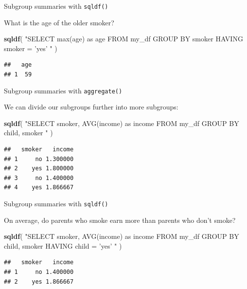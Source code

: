\documentclass[ignorenonframetext,]{beamer}
\newenvironment{Shaded}{\begin{snugshade}}{\end{snugshade}}
\newcommand{\KeywordTok}[1]{\textcolor[rgb]{0.13,0.29,0.53}{\textbf{#1}}}
\newcommand{\NormalTok}[1]{#1}
\newcommand{\StringTok}[1]{\textcolor[rgb]{0.31,0.60,0.02}{#1}}
\begin{document}
\begin{frame}[fragile]{Subgroup summaries with \texttt{sqldf()}}
\protect\hypertarget{subgroup-summaries-with-sqldf-5}{}

What is the age of the older smoker?

\begin{Shaded}
\begin{Highlighting}[]
\KeywordTok{sqldf}\NormalTok{(}
  \StringTok{"SELECT max(age) as age }
\StringTok{  FROM my_df}
\StringTok{  GROUP BY smoker}
\StringTok{  HAVING smoker = 'yes'}
\StringTok{  "}
\NormalTok{)}
\end{Highlighting}
\end{Shaded}

\begin{verbatim}
##   age
## 1  59
\end{verbatim}

\end{frame}

\begin{frame}[fragile]{Subgroup summaries with \texttt{aggregate()}}
\protect\hypertarget{subgroup-summaries-with-aggregate-25}{}

We can divide our subgroups further into more subgroups:

\begin{Shaded}
\begin{Highlighting}[]
\KeywordTok{sqldf}\NormalTok{(}
  \StringTok{"SELECT smoker, AVG(income) as income}
\StringTok{  FROM my_df}
\StringTok{  GROUP BY child, smoker}
\StringTok{  "}
\NormalTok{)}
\end{Highlighting}
\end{Shaded}

\begin{verbatim}
##   smoker   income
## 1     no 1.300000
## 2    yes 1.800000
## 3     no 1.400000
## 4    yes 1.866667
\end{verbatim}

\end{frame}

\begin{frame}[fragile]{Subgroup summaries with \texttt{sqldf()}}
\protect\hypertarget{subgroup-summaries-with-sqldf-6}{}

On average, do parents who smoke earn more than parents who don't smoke?

\begin{Shaded}
\begin{Highlighting}[]
\KeywordTok{sqldf}\NormalTok{(}
  \StringTok{"SELECT smoker, AVG(income) as income}
\StringTok{  FROM my_df}
\StringTok{  GROUP BY child, smoker}
\StringTok{  HAVING child = 'yes'}
\StringTok{  "}
\NormalTok{)}
\end{Highlighting}
\end{Shaded}

\begin{verbatim}
##   smoker   income
## 1     no 1.400000
## 2    yes 1.866667
\end{verbatim}

\end{frame}
\end{document}
